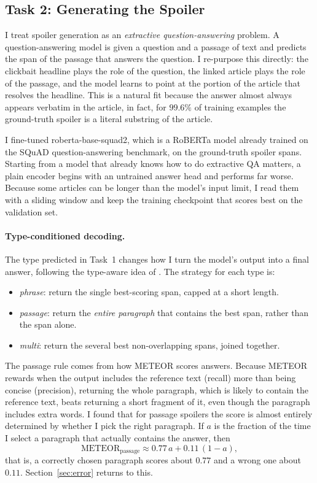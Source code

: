 \documentclass[11pt]{article}
\begin{document}
\subsection{Task 2: Generating the Spoiler}
I treat spoiler generation as an \textit{extractive question-answering} problem. A
question-answering model is given a question and a passage of text and predicts
the span of the passage that answers the question. I re-purpose this directly:
the clickbait headline plays the role of the question, the linked article plays
the role of the passage, and the model learns to point at the portion of the
article that resolves the headline. This is a natural fit because the answer
almost always appears verbatim in the article, in fact, for $99.6\%$ of training examples
the ground-truth spoiler is a literal substring of the article.


I fine-tuned roberta-base-squad2, which is a RoBERTa model already trained on the
SQuAD question-answering benchmark, on the ground-truth spoiler spans. Starting
from a model that already knows how to do extractive QA matters, a plain encoder
begins with an untrained answer head and performs far worse. Because some articles can
be longer than the model's input limit, I read them with a sliding window and
keep the training checkpoint that scores best on the validation set.
\paragraph{Type-conditioned decoding.}
The type predicted in Task~1 changes how I turn the model's output into a final
answer, following the type-aware idea of \citet{hagen2022}. The strategy for each type is:
\begin{itemize}
  \item \textit{phrase}: return the single best-scoring span, capped at a short length.
  \item \textit{passage}: return the \textit{entire paragraph} that contains the
  best span, rather than the span alone.
  \item \textit{multi}: return the several best non-overlapping spans, joined together.
\end{itemize}

The passage rule comes from how METEOR scores answers. Because METEOR rewards
when the output includes the reference text (recall) more than being concise (precision), returning
the whole paragraph, which is likely to contain the reference text, beats returning a
short fragment of it, even though the paragraph includes extra words. I found
that for passage spoilers the score is almost entirely determined by whether I
pick the right paragraph. If $a$ is the fraction of the time I select a paragraph
that actually contains the answer, then
\begin{equation}
  \text{METEOR}_{\text{passage}} \approx 0.77\,a + 0.11\,(1-a),
  \label{eq:passage}
\end{equation}
that is, a correctly chosen paragraph scores about $0.77$ and a wrong one about
$0.11$. Section~\ref{sec:error} returns to this.
\end{document}

